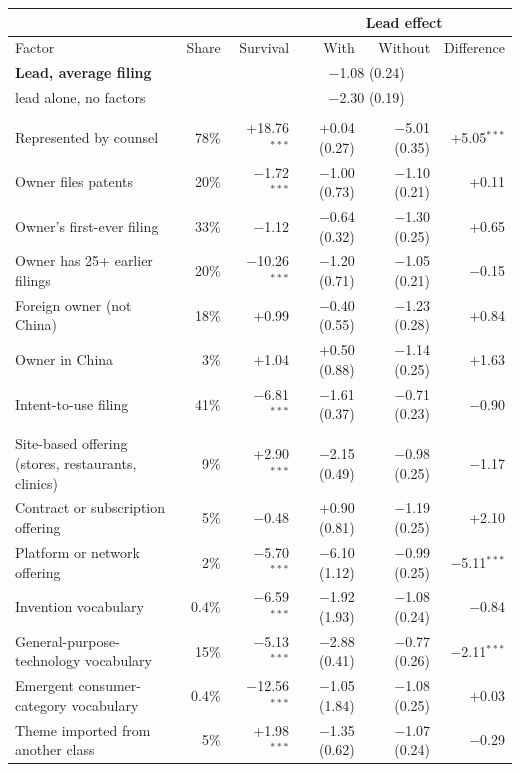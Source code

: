 {\small\begin{longtable}{>{\raggedright\arraybackslash}p{4.9cm}rrrrr}
\toprule & & & \multicolumn{3}{c}{Lead effect} \\ \cmidrule(l){4-6} Factor & Share & Survival & With & Without & Difference \\ \midrule \endhead
\textbf{Lead, average filing} & & & \multicolumn{2}{c}{$-$1.08 (0.24)} & \\
\quad lead alone, no factors & & & \multicolumn{2}{c}{$-$2.30 (0.19)} & \\
\addlinespace\multicolumn{6}{l}{\emph{The owner and the filing}} \\
Represented by counsel & 78\% & +18.76$^{***}$ & +0.04 (0.27) & $-$5.01 (0.35) & +5.05$^{***}$ \\
Owner files patents & 20\% & $-$1.72$^{***}$ & $-$1.00 (0.73) & $-$1.10 (0.21) & +0.11 \\
Owner's first-ever filing & 33\% & $-$1.12 & $-$0.64 (0.32) & $-$1.30 (0.25) & +0.65 \\
Owner has 25+ earlier filings & 20\% & $-$10.26$^{***}$ & $-$1.20 (0.71) & $-$1.05 (0.21) & $-$0.15 \\
Foreign owner (not China) & 18\% & +0.99 & $-$0.40 (0.55) & $-$1.23 (0.28) & +0.84 \\
Owner in China & 3\% & +1.04 & +0.50 (0.88) & $-$1.14 (0.25) & +1.63 \\
Intent-to-use filing & 41\% & $-$6.81$^{***}$ & $-$1.61 (0.37) & $-$0.71 (0.23) & $-$0.90 \\
\addlinespace\multicolumn{6}{l}{\emph{The offering}} \\
Site-based offering (stores, restaurants, clinics) & 9\% & +2.90$^{***}$ & $-$2.15 (0.49) & $-$0.98 (0.25) & $-$1.17 \\
Contract or subscription offering & 5\% & $-$0.48 & +0.90 (0.81) & $-$1.19 (0.25) & +2.10 \\
Platform or network offering & 2\% & $-$5.70$^{***}$ & $-$6.10 (1.12) & $-$0.99 (0.25) & $-$5.11$^{***}$ \\
Invention vocabulary & 0.4\% & $-$6.59$^{***}$ & $-$1.92 (1.93) & $-$1.08 (0.24) & $-$0.84 \\
General-purpose-technology vocabulary & 15\% & $-$5.13$^{***}$ & $-$2.88 (0.41) & $-$0.77 (0.26) & $-$2.11$^{***}$ \\
Emergent consumer-category vocabulary & 0.4\% & $-$12.56$^{***}$ & $-$1.05 (1.84) & $-$1.08 (0.25) & +0.03 \\
Theme imported from another class & 5\% & +1.98$^{***}$ & $-$1.35 (0.62) & $-$1.07 (0.24) & $-$0.29 \\

\end{longtable}}
